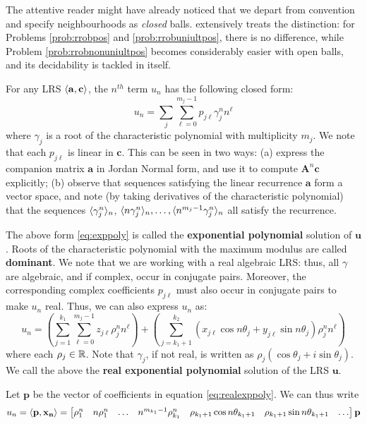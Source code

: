 The attentive reader might have already noticed that we depart from convention and specify neighbourhoods as \textit{closed} balls. \cite{originalarxiv} extensively treats the distinction: for Problems \ref{prob:rrobpos} and \ref{prob:rrobuniultpos}, there is no difference, while Problem \ref{prob:rrobnonuniultpos} becomes considerably easier with open balls, and its decidability is tackled in \cite{originalarxiv} itself.

For any LRS $\langle\mathbf{a}, \mathbf{c}\rangle$, the $n^{th}$ term $u_n$ has the following closed form:
\begin{equation}
\label{eq:exppoly}
u_n = \sum_{j}\sum_{\ell=0}^{m_j - 1}p_{j\ell}\gamma_j^n n^\ell
\end{equation}
where $\gamma_j$ is a root of the characteristic polynomial with multiplicity $m_j$. We note that each $p_{j\ell}$ is linear in $\mathbf{c}$. This can be seen in two ways: (a) express the companion matrix $\mathbf{a}$ in Jordan Normal form, and use it to compute $\mathbf{A}^n\mathbf{c}$ explicitly; (b) observe that sequences satisfying the linear recurrence $\mathbf{a}$ form a vector space, and note (by taking derivatives of the characteristic polynomial) that the sequences $\langle\gamma_j^n\rangle_n$, $\langle n\gamma_j^n\rangle_n, \dots, \langle n^{m_j-1}\gamma_j^n\rangle_n$ all satisfy the recurrence. 

The above form \ref{eq:exppoly} is called the \textbf{exponential polynomial} solution of $\mathbf{u}$. Roots of the characteristic polynomial with the maximum modulus are called \textbf{dominant}. We note that we are working with a real algebraic LRS: thus, all $\gamma$ are algebraic, and if complex, occur in conjugate pairs. Moreover, the corresponding complex coefficients $p_{j\ell}$ must also occur in conjugate pairs to make $u_n$ real. Thus, we can also express $u_n$ as:
\begin{equation}
\label{eq:realexppoly}
u_n = \left(\sum_{j=1}^{k_1}\sum_{\ell = 0}^{m_j-1} z_{j\ell}\rho_j^n n^\ell\right) + \left(\sum_{j=k_1 + 1}^{k_2}  (x_{j\ell} \cos n\theta_j + y_{j\ell}\sin n\theta_j)\rho_j^n n^\ell\right)
\end{equation}
where each $\rho_j \in \mathbb{R}$. Note that $\gamma_j$, if not real, is written as $\rho_j(\cos \theta_j + i\sin \theta_j)$. We call the above the \textbf{real exponential polynomial} solution of the LRS $\mathbf{u}$. 

Let $\mathbf{p}$ be the vector of coefficients in equation \ref{eq:realexppoly}. We can thus write
\begin{equation}
\label{eq:innerprod}
u_n = \langle\mathbf{p}, \mathbf{x_n}\rangle= 
\begin{bmatrix}
\rho_1^n & n \rho_1^n & \dots & n^{m_{k_1}-1}\rho_{k_1}^n & \rho_{k_1+1}\cos n\theta_{k_1+1} & \rho_{k_1+1}\sin n\theta_{k_1+1} & \dots
\end{bmatrix}\mathbf{p}
\end{equation}

